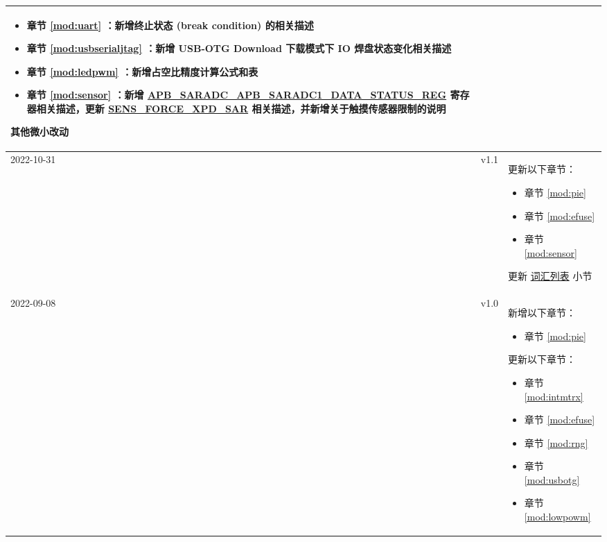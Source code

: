 \begin{longtable}[l]{ | m{2cm} | m{1.5cm} | m{12cm} | }
\begin{itemize}
        \item 章节 \ref{mod:uart} \textit{\nameref{mod:uart}}：新增终止状态 (break condition) 的相关描述 %
        \item 章节 \ref{mod:usbserialjtag} \textit{\nameref{mod:usbserialjtag}}：新增 USB-OTG Download 下载模式下 IO 焊盘状态变化相关描述 %
        \item 章节 \ref{mod:ledpwm} \textit{\nameref{mod:ledpwm}}：新增占空比精度计算公式和表 \textit{\nameref{tab:ledc-common-freq-res}}
        \item 章节 \ref{mod:sensor} \textit{\nameref{mod:sensor}}：\newline 新增 \hyperref[regdesc:APBSARADCAPBSARADC1DATASTATUSREG]{APB\_SARADC\_APB\_SARADC1\_DATA\_STATUS\_REG} 寄存器相关描述，更新 \hyperref[fielddesc:SENSFORCEXPDSAR]{SENS\_FORCE\_XPD\_SAR} 相关描述，并新增关于触摸传感器限制的说明
    \end{itemize}
    其他微小改动
    \\\hline
    2022-10-31         & v1.1  &
    更新以下章节：
    \begin{itemize}
        \item 章节 \ref{mod:pie} \textit{\nameref{mod:pie}}
        \item 章节 \ref{mod:efuse} \textit{\nameref{mod:efuse}}
        \item 章节 \ref{mod:sensor} \textit{\nameref{mod:sensor}}%
    \end{itemize}
    更新 \hyperref[glossary]{词汇列表} 小节
    \\\hline
    2022-09-08         & v1.0  &
    新增以下章节：
    \begin{itemize}
        \item 章节 \ref{mod:pie} \textit{\nameref{mod:pie}}
    \end{itemize}
    更新以下章节：
    \begin{itemize}
        \item 章节 \ref{mod:intmtrx} \textit{\nameref{mod:intmtrx}}
        \item 章节 \ref{mod:efuse} \textit{\nameref{mod:efuse}}
        \item 章节 \ref{mod:rng} \textit{\nameref{mod:rng}}
        \item 章节 \ref{mod:usbotg} \textit{\nameref{mod:usbotg}}
        \item 章节 \ref{mod:lowpowm} \textit{\nameref{mod:lowpowm}}
    \end{itemize}
    \\\hline

\end{longtable}
